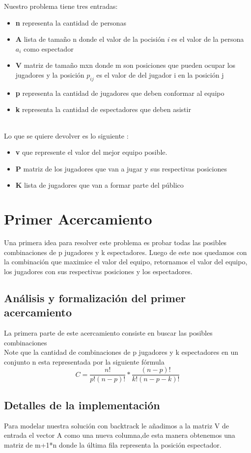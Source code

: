 \documentclass[sn-mathphys,Numbered]{sn-jnl}%
\theoremstyle{thmstyleone}%
\theoremstyle{thmstyletwo}%
\theoremstyle{thmstylethree}%
\begin{document}
Nuestro problema tiene tres entradas:
\begin{itemize}
    \item \textbf{n} representa la cantidad de personas 
    \item \textbf{A} lista de tama\~no n donde el valor de la pocisi\'on \textit{i} es el valor de la persona $a_i$ como espectador
    \item \textbf{V} matriz de tama\~no mxn donde m son posiciones que pueden ocupar los jugadores y la posici\'on $p_{ij}$ es el valor de del jugador i en la posici\'on j
    \item \textbf{p} representa la cantidad de jugadores que deben conformar al equipo
    \item \textbf{k} representa la cantidad de espectadores que deben asistir
\end{itemize}\\
Lo que se quiere devolver es lo siguiente :
 \begin{itemize}
     \item \textbf{v} que represente el valor del mejor equipo posible.
     \item \textbf{P} matriz de los jugadores que van a jugar y sus respectivas posiciones 
     \item \textbf{K} lista de jugadores que van a formar parte del p\'ublico
 \end{itemize}

\section{Primer Acercamiento}\label{sec4}
Una primera idea para resolver este problema es probar todas las posibles combinaciones de p jugadores y k espectadores. Luego de este nos quedamos con la combinación que maximice el valor del equipo, retornamos el valor del equipo, los jugadores con sus respectivas posiciones y los espectadores.
\subsection*{Análisis y formalización  del primer acercamiento}
La primera parte de este acercamiento consiste en buscar las posibles combinaciones\\
 Note que la cantidad de combinaciones de p jugadores y k espectadores en un conjunto n esta representada por la siguiente f\'ormula\\
 $$ C = \frac{n!}{p!(n-p)!} * \frac{(n-p)!}{k!(n-p-k)!}$$
\subsection*{Detalles de la implementaci\'on}
Para modelar nuestra soluci\'on con backtrack le a\~nadimos a la matriz V de entrada el vector A como una nueva columna,de esta manera obtenemos una matriz de m+1*n donde la \'ultima fila representa la posición espectador. \\
\end{document}
